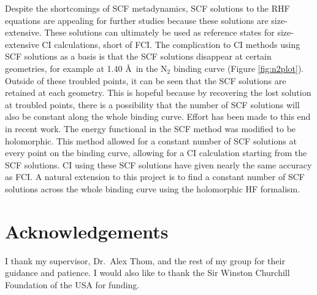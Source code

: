 \documentclass[final,3p,times,twocolumn]{elsarticle}
\begin{document}
Despite the shortcomings of SCF metadynamics, SCF solutions to the RHF equations are appealing for further studies because these solutions are size-extensive. These solutions can ultimately be used as reference states for size-extensive CI calculations, short of FCI.\cite{thom-2009} The complication to CI methods using SCF solutions as a basis is that the SCF solutions disappear at certain geometries, for example at 1.40 \AA\ in the N$_2$ binding curve (Figure \ref{fig:n2plot}). Outside of these troubled points, it can be seen that the SCF solutions are retained at each geometry. This is hopeful because by recovering the lost solution at troubled points, there is a possibility that the number of SCF solutions will also be constant along the whole binding curve. Effort has been made to this end in recent work. The energy functional in the SCF method was modified to be holomorphic. This method allowed for a constant number of SCF solutions at every point on the binding curve, allowing for a CI calculation starting from the SCF solutions.\cite{thom-2014} CI using these SCF solutions have given nearly the same accuracy as FCI.\cite{thom-2016} A natural extension to this project is to find a constant number of SCF solutions across the whole binding curve using the holomorphic HF formalism.\cite{thom-2014}


\section*{Acknowledgements}
I thank my supervisor, Dr.\ Alex Thom, and the rest of my group for their guidance and patience. I would also like to thank the Sir Winston Churchill Foundation of the USA for funding.















\end{document}
